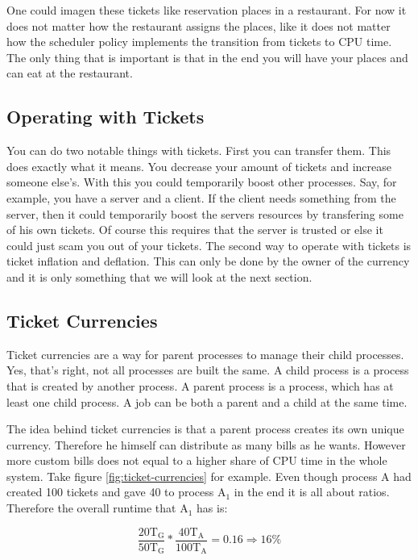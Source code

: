 One could imagen these tickets like reservation places in a restaurant. For now it does not matter how the restaurant assigns the places, like it does not matter how the scheduler policy implements the transition from tickets to CPU time. The only thing that is important is that in the end you will have your places and can eat at the restaurant.


\subsection{Operating with Tickets}

You can do two notable things with tickets. First you can transfer them. 
This does exactly what it means. You decrease your amount of tickets and increase someone else's. 
With this you could temporarily boost other processes.
Say, for example, you have a server and a client.
If the client needs something from the server, then it could temporarily boost the servers resources by transfering some of his own tickets.
Of course this requires that the server is trusted or else it could just scam you out of your tickets.
The second way to operate with tickets is ticket inflation and deflation. This can only be done by the owner of the currency and it is only something that we will look at the next section.

\subsection{Ticket Currencies}

Ticket currencies are a way for parent processes to manage their child processes.
Yes, that's right, not all processes are built the same.
A child process is a process that is created by another process.
A parent process is a process, which has at least one child process.
A job can be both a parent and a child at the same time.

The idea behind ticket currencies is that a parent process creates its own unique currency. Therefore he himself can distribute as many bills as he wants. 
However more custom bills does not equal to a higher share of CPU time in the whole system.
Take figure \ref{fig:ticket-currencies} for example. Even though process A had created 100 tickets and gave 40 to process A$_1$ in the end it is all about ratios.
Therefore the overall runtime that A$_1$ has is: 

$$\frac{20\text{T}_\text{G}}{50\text{T}_\text{G}} * \frac{40\text{T}_\text{A}}{100\text{T}_\text{A}} = 0.16 \Rightarrow 16\%$$

